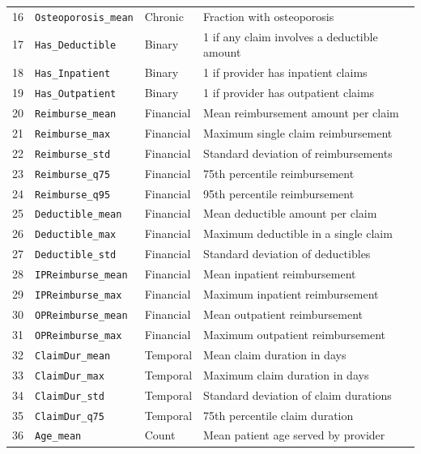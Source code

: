 \begin{longtable}{p{0.8cm}p{4.6cm}p{2.5cm}p{6.0cm}}
16 & \texttt{Osteoporosis\_mean}   & Chronic   & Fraction with osteoporosis \\
17 & \texttt{Has\_Deductible}      & Binary    & 1 if any claim involves a deductible amount \\
18 & \texttt{Has\_Inpatient}       & Binary    & 1 if provider has inpatient claims \\
19 & \texttt{Has\_Outpatient}      & Binary    & 1 if provider has outpatient claims \\
20 & \texttt{Reimburse\_mean}      & Financial & Mean reimbursement amount per claim \\
21 & \texttt{Reimburse\_max}       & Financial & Maximum single claim reimbursement \\
22 & \texttt{Reimburse\_std}       & Financial & Standard deviation of reimbursements \\
23 & \texttt{Reimburse\_q75}       & Financial & 75th percentile reimbursement \\
24 & \texttt{Reimburse\_q95}       & Financial & 95th percentile reimbursement \\
25 & \texttt{Deductible\_mean}     & Financial & Mean deductible amount per claim \\
26 & \texttt{Deductible\_max}      & Financial & Maximum deductible in a single claim \\
27 & \texttt{Deductible\_std}      & Financial & Standard deviation of deductibles \\
28 & \texttt{IPReimburse\_mean}    & Financial & Mean inpatient reimbursement \\
29 & \texttt{IPReimburse\_max}     & Financial & Maximum inpatient reimbursement \\
30 & \texttt{OPReimburse\_mean}    & Financial & Mean outpatient reimbursement \\
31 & \texttt{OPReimburse\_max}     & Financial & Maximum outpatient reimbursement \\
32 & \texttt{ClaimDur\_mean}       & Temporal  & Mean claim duration in days \\
33 & \texttt{ClaimDur\_max}        & Temporal  & Maximum claim duration in days \\
34 & \texttt{ClaimDur\_std}        & Temporal  & Standard deviation of claim durations \\
35 & \texttt{ClaimDur\_q75}        & Temporal  & 75th percentile claim duration \\
36 & \texttt{Age\_mean}            & Count     & Mean patient age served by provider \\

\end{longtable}
